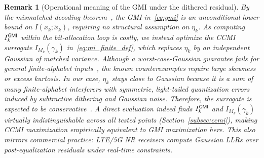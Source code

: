 \documentclass[10pt, twocolumn, comsoc]{IEEEtran}
\newtheorem{remark}{Remark}
\begin{document}
\begin{remark}[Operational meaning of the GMI under the dithered residual] \label{rem:gaussian_residual}
\normalfont
By the mismatched-decoding theorem~\cite{merhav1994information, ganti2000mismatched},
the GMI in~\eqref{eq:gmi} is an unconditional lower bound on $I(x_k;\tilde{x}_k)$, requiring no structural assumption on $\eta_k$. 
As computing $I_k^{\sf GMI}$ within the bit-allocation loop is costly, we instead optimize the CCMI surrogate $I_{M_k}(\gamma_k)$ in~\eqref{eq:mi_finite_def}, which replaces $\eta_k$ by an independent Gaussian of matched variance. 
Although a worst-case-Gaussian guarantee fails for general finite-alphabet inputs~\cite{carmon2012disproof}, the known counterexamples require large skewness or excess kurtosis.
In our case, $\eta_k$ stays close to Gaussian because it is a sum of many finite-alphabet interferers with symmetric, light-tailed quantization errors induced by subtractive dithering and Gaussian noise. 
Therefore, the surrogate is expected to be conservative~\cite{bruno2026mismatch}. 
A direct evaluation indeed finds $I_k^{\sf GMI}$ and $I_{M_k}(\gamma_k)$ virtually indistinguishable across all
tested points (Section~\ref{subsec:ccmi}), making CCMI maximization empirically equivalent to GMI maximization here. This also mirrors commercial practice: LTE/5G NR receivers
compute Gaussian LLRs over post-equalization residuals under real-time constraints.
\end{remark}



\end{document}
